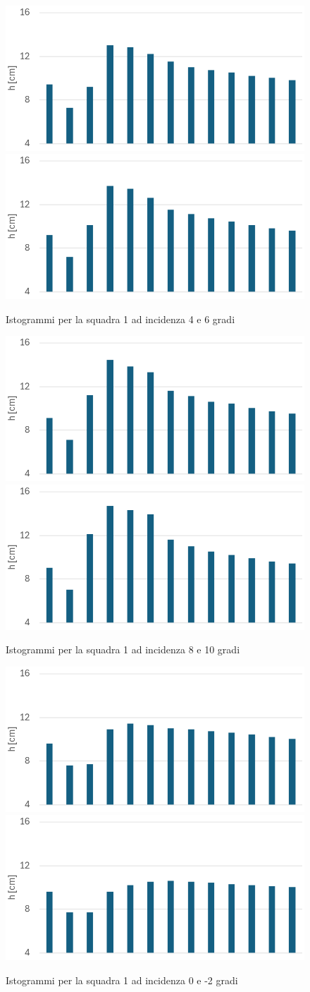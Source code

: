 \begin{figure}[H]
    \centering
    \includegraphics[width=.49\textwidth]{images/5/dsq1a4.png}
    \includegraphics[width=.49\textwidth]{images/5/dsq1a6.png}
    \caption{Istogrammi per la squadra 1 ad incidenza 4 e 6 gradi}
\end{figure}

\begin{figure}[H]
    \centering
    \includegraphics[width=.49\textwidth]{images/5/dsq1a8.png}
    \includegraphics[width=.49\textwidth]{images/5/dsq1a10.png}
    \caption{Istogrammi per la squadra 1 ad incidenza 8 e 10 gradi}
\end{figure}

\begin{figure}[H]
    \centering
    \includegraphics[width=.49\textwidth]{images/5/dsq1a0.png}
    \includegraphics[width=.49\textwidth]{images/5/dsq1a-2.png}
    \caption{Istogrammi per la squadra 1 ad incidenza 0 e -2 gradi}
\end{figure}

